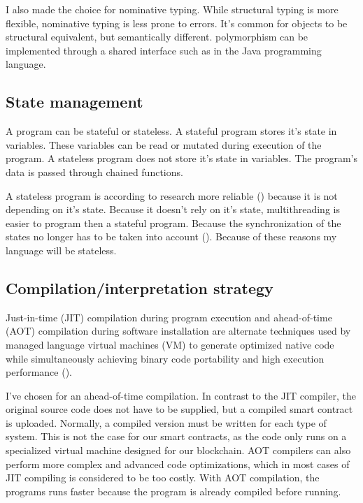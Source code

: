 \documentclass{uva-inf-article}
\begin{document}
\par I also made the choice for nominative typing. 
While structural typing is more flexible, nominative typing is less prone to errors.
It's common for objects to be structural equivalent, but semantically different.
polymorphism can be implemented through a shared interface such as in the Java programming language.

\subsection{State management}
\par A program can be stateful or stateless. A stateful program stores it's state in variables.
These variables can be read or mutated during execution of the program.
A stateless program does not store it's state in variables. 
The program's data is passed through chained functions.\vspace{5mm}

\par A stateless program is according to research more reliable (\cite{Merelo2018}) because it is not depending on it's state.
Because it doesn't rely on it's state, multithreading is easier to program then a stateful program. 
Because the synchronization of the states no longer has to be taken into account (\cite{Merelo2018}).
Because of these reasons my language will be stateless.

\newpage
\subsection{Compilation/interpretation strategy}
\par Just-in-time (JIT) compilation during program execution and ahead-of-time (AOT) compilation during 
software installation are alternate techniques used by managed language virtual machines (VM) to 
generate optimized native code while simultaneously achieving binary code portability and 
high execution performance (\cite{wade2017aot}).
\vspace{5mm}

\par I've chosen for an ahead-of-time compilation. In contrast to the JIT compiler, 
the original source code does not have to be supplied, but a compiled smart contract is uploaded.
Normally, a compiled version must be written for each type of system. 
This is not the case for our smart contracts, as the code only runs on a specialized virtual machine 
designed for our blockchain. AOT compilers can also perform more complex and advanced code optimizations,
which in most cases of JIT compiling is considered to be too costly.
With AOT compilation, the programs runs faster because the program is already compiled before running.
\end{document}
